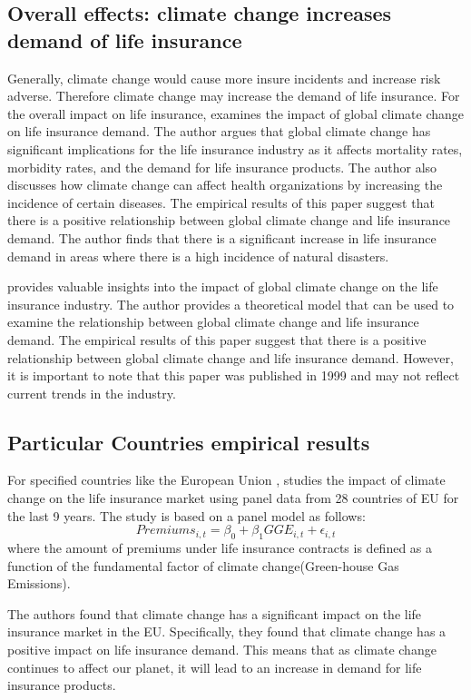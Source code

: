 \documentclass[a4paper,12pt]{article}
\begin{document}
\subsection{Overall effects: climate change increases demand of life insurance}
Generally, climate change would cause more insure incidents and increase risk adverse. Therefore climate change may increase the demand of life insurance. For the overall impact on life insurance, \cite{peara1999global} examines the impact of global climate change on life insurance demand. The author argues that global climate change has significant implications for the life insurance industry as it affects mortality rates, morbidity rates, and the demand for life insurance products. The author also discusses how climate change can affect health organizations by increasing the incidence of certain diseases. The empirical results of this paper suggest that there is a positive relationship between global climate change and life insurance demand. The author finds that there is a significant increase in life insurance demand in areas where there is a high incidence of natural disasters.

\cite{peara1999global} provides valuable insights into the impact of global climate change on the life insurance industry. The author provides a theoretical model that can be used to examine the relationship between global climate change and life insurance demand. The empirical results of this paper suggest that there is a positive relationship between global climate change and life insurance demand. However, it is important to note that this paper was published in 1999 and may not reflect current trends in the industry.

\subsection{Particular Countries empirical results}
For specified countries like the European Union , \cite{melnychenko2021influence} studies the impact of climate change on the life insurance market using panel data from 28 countries of EU for the last 9 years. The study is based on a panel model as follows:
$$Premiums_{i,t}=\beta_0+\beta_1 GGE_{i,t}+\epsilon_{i,t}$$
where the amount of premiums under life insurance contracts is defined as a function of the fundamental factor of climate change(Green-house Gas Emissions).

The authors found that climate change has a significant impact on the life insurance market in the EU. Specifically, they found that climate change has a positive impact on life insurance demand. This means that as climate change continues to affect our planet, it will lead to an increase in demand for life insurance products.
\end{document}
